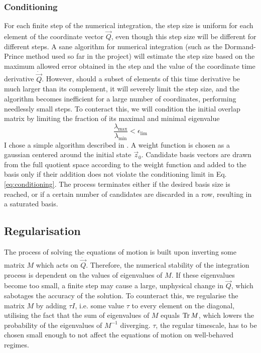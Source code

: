 \documentclass[12pt]{article}
\begin{document}
	\subsubsection{Conditioning}
	For each finite step of the numerical integration, the step size is uniform for each element of the coordinate vector $\vec{Q}$, even though this step size will be different for different steps. A sane algorithm for numerical integration (such as the Dormand-Prince method used so far in the project) will estimate the step size based on the maximum allowed error obtained in the step and the value of the coordinate time derivative $\dot{\vec{Q}}$. However, should a subset of elements of this time derivative be much larger than its complement, it will severely limit the step size, and the algorithm becomes inefficient for a large number of coordinates, performing needlessly small steps. To conteract this, we will condition the initial overlap matrix by limiting the fraction of its maximal and minimal eigenvalue
	\begin{equation}\label{eq:conditioning}
	\frac{\lambda_{\text{max}}}{\lambda_{\text{min}}}<\epsilon_{\text{lim}}
	\end{equation}
	I chose a simple algorithm described in \cite{sampling_algorithm}. A weight function is chosen as a gaussian centered around the initial state $\vec{z}_0$. Candidate basis vectors are drawn from the full quotient space according to the weight function and added to the basis only if their addition does not violate the conditioning limit in Eq. \ref{eq:conditioning}. The process terminates either if the desired basis size is reached, or if a certain number of candidates are discarded in a row, resulting in a saturated basis.
	
	\subsection{Regularisation}
	
	The process of solving the equations of motion is built upon inverting some matrix $M$ which acts on $\dot{\vec{Q}}$. Therefore, the numerical stability of the integration process is dependent on the values of eigenvalues of $M$. If these eigenvalues become too small, a finite step may cause a large, unphysical change in $\vec{Q}$, which sabotages the accuracy of the solution. To counteract this, we regularise the matrix $M$ by adding $\tau I$, i.e. some value $\tau$ to every element on the diagonal, utilising the fact that the sum of eigenvalues of $M$ equals $\Tr M$, which lowers the probability of the eigenvalues of $M^{-1}$ diverging. $\tau$, the regular timescale, has to be chosen small enough to not affect the equations of motion on well-behaved regimes.
	
\end{document}
